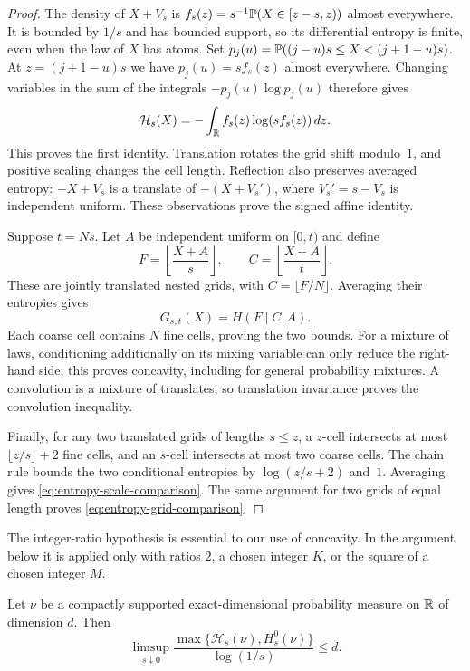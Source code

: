 \begin{proof}
The density of $X+V_s$ is
$f_s(z)=s^{-1}\P(X\in[z-s,z))$ almost everywhere.  It is bounded by
$1/s$ and has bounded support, so its differential entropy is finite,
even when the law of $X$ has atoms.  Set
$p_j(u)=\P((j-u)s\le X<(j+1-u)s)$.  At
$z=(j+1-u)s$ we have $p_j(u)=sf_s(z)$ almost everywhere.
Changing variables in the sum of the integrals
$-p_j(u)\log p_j(u)$ therefore gives
\[
 \mathcal H_s(X)=-\int_{\R}f_s(z)\log(sf_s(z))\,dz.
\]
This proves the first identity.  Translation rotates the grid shift
modulo~$1$, and positive scaling changes the cell length.
Reflection also preserves averaged entropy: $-X+V_s$ is a translate of
$-(X+V_s')$, where $V_s'=s-V_s$ is independent uniform.
These observations prove the signed affine identity.

Suppose $t=Ns$.  Let $A$ be independent uniform on $[0,t)$ and define
\[
 F=\left\lfloor\frac{X+A}{s}\right\rfloor,
 \qquad C=\left\lfloor\frac{X+A}{t}\right\rfloor.
\]
These are jointly translated nested grids, with $C=\lfloor F/N\rfloor$.
Averaging their entropies gives
\begin{equation}\label{eq:nested-conditional-entropy}
 G_{s,t}(X)=H(F\mid C,A).
\end{equation}
Each coarse cell contains $N$ fine cells, proving the two bounds.
For a mixture of laws, conditioning additionally on its mixing variable
can only reduce the right-hand side; this proves concavity, including
for general probability mixtures.  A convolution is a mixture of
translates, so translation invariance proves the convolution inequality.

Finally, for any two translated grids of lengths $s\le z$, a $z$-cell
intersects at most $\lfloor z/s\rfloor+2$ fine cells, and an $s$-cell
intersects at most two coarse cells.  The chain rule bounds the two
conditional entropies by $\log(z/s+2)$ and~$1$.  Averaging gives
\eqref{eq:entropy-scale-comparison}.  The same argument for two grids of
equal length proves \eqref{eq:entropy-grid-comparison}.
\end{proof}

The integer-ratio hypothesis is essential to our use of concavity.
In the argument below it is applied only with ratios $2$, a chosen
integer $K$, or the square of a chosen integer $M$.

\begin{lemma}\label{lem:entropy-dimension}
Let $\nu$ be a compactly supported exact-dimensional probability measure
on $\R$ of dimension $d$.  Then
\begin{equation}\label{eq:entropy-dimension-upper}
 \limsup_{s\downarrow0}
 \frac{\max\{\mathcal H_s(\nu),H_s^0(\nu)\}}
 {\log(1/s)}\le d.
\end{equation}
\end{lemma}

